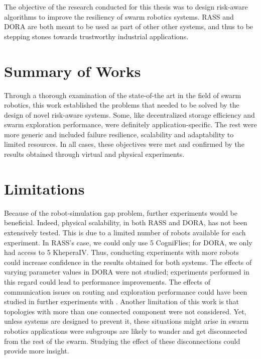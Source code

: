\label{sec:Conclusion}
The objective of the research conducted for this thesis was to design risk-aware algorithms to improve the resiliency of swarm robotics systems. RASS and DORA are both meant to be used as part of other other systems, and thus to be stepping stones towards trustworthy industrial applications.

\section{Summary of Works}
Through a thorough examination of the state-of-the art in the field of swarm robotics, this work established the problems that needed to be solved by the design of novel risk-aware systems. Some, like decentralized storage efficiency and swarm exploration performance, were definitely application-specific. The rest were more generic and included failure resilience, scalability and adaptability to limited resources. In all cases, these objectives were met and confirmed by the results obtained through virtual and physical experiments.


\section{Limitations}\label{sec:Limitations}
Because of the robot-simulation gap problem, further experiments would be beneficial. Indeed, physical scalability, in both RASS and DORA, has not been extensively tested. This is due to a limited number of robots available for each experiment. In \ac{RASS}'s case, we could only use 5 CogniFlies; for \ac{DORA}, we only had access to 5 KheperaIV. Thus, conducting experiments with more robots could increase confidence in the results obtained for both systems. The effects of varying parameter values in \ac{DORA} were not studied; experiments performed in this regard could lead to performance improvements. The effects of communication issues on routing and exploration performance could have been studied in further experiments with \cite{selden2021botnet}. Another limitation of this work is that topologies with more than one connected component were not considered. Yet, unless systems are designed to prevent it, these situations might arise in swarm robotics applications were subgroups are likely to wander and get disconnected from the rest of the swarm. Studying the effect of these disconnections could provide more insight.

